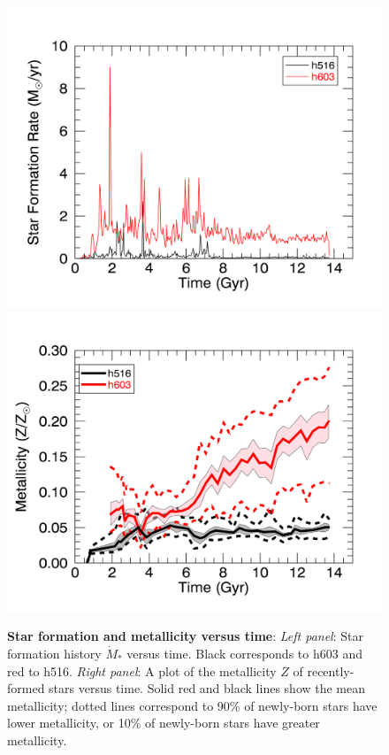 \documentclass[a4paper,fleqn,usenatbib]{mnras}
\newcommand\unit[1]{\text{#1}}
\newcommand\ExcitingGalaxy{h258}
\newcommand\BoringGalaxy{h277}
\begin{document}
\begin{figure}
\includegraphics[width=\columnwidth]{Figures/sfh_dwarf}
\includegraphics[width=\columnwidth]{Figures/dwarf_zvst}
\caption{\label{fig:TwoDwarfGalaxies}\textbf{Star formation and metallicity versus time}:  \emph{Left panel}: Star formation history $\dot{M}_{*}$
  versus time.  Black corresponds to h603 and red to h516.  
\emph{Right panel}: A plot of the  metallicity $Z$ of recently-formed stars versus time.  Solid red and black lines show
the mean metallicity; dotted lines correspond to  90\% of newly-born stars have lower metallicity,   or 10\% of
newly-born stars have greater metallicity.  %
}
\end{figure}
\end{document}
